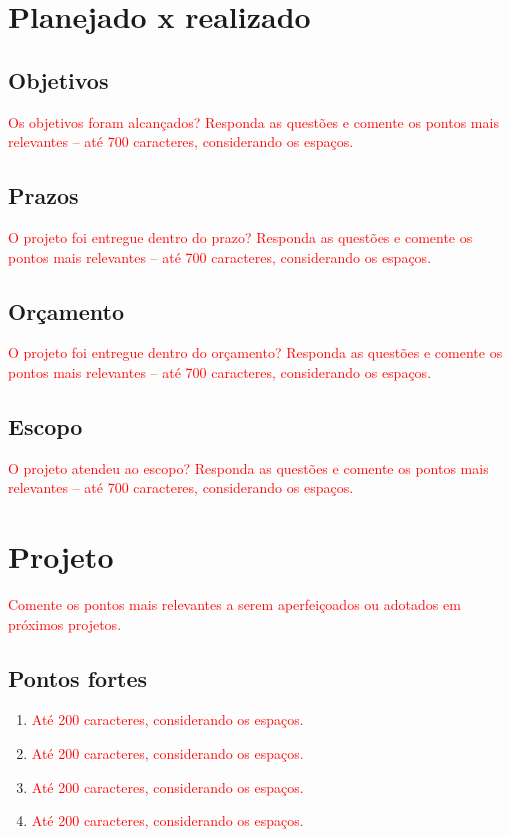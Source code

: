 \section{Planejado x realizado}
\subsection{Objetivos}
\textcolor{red}{Os objetivos foram alcançados? Responda as questões e comente os pontos mais relevantes – até 700 caracteres, considerando os espaços.}
\subsection{Prazos}
\textcolor{red}{O projeto foi entregue dentro do prazo? Responda as questões e comente os pontos mais relevantes – até 700 caracteres, considerando os espaços.}
\subsection{Orçamento}
\textcolor{red}{O projeto foi entregue dentro do orçamento? Responda as questões e comente os pontos mais relevantes – até 700 caracteres, considerando os espaços.}
\subsection{Escopo}
\textcolor{red}{O  projeto atendeu ao escopo? Responda as questões e comente os pontos mais relevantes – até 700 caracteres, considerando os espaços.}


\section{Projeto}
\textcolor{red}{Comente os pontos mais relevantes a serem aperfeiçoados ou adotados em próximos projetos.}
\subsection{Pontos fortes}
\begin{enumerate}
	\item \textcolor{red}{Até 200 caracteres, considerando os espaços.}
	\item \textcolor{red}{Até 200 caracteres, considerando os espaços.}
	\item \textcolor{red}{Até 200 caracteres, considerando os espaços.}
	\item \textcolor{red}{Até 200 caracteres, considerando os espaços.}
\end{enumerate}
